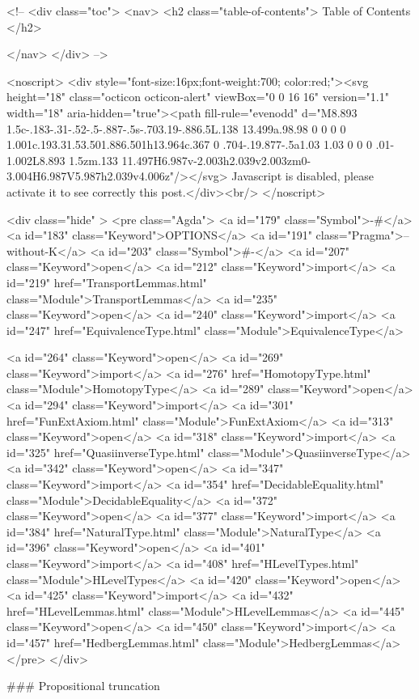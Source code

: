   <!-- 
  <div class="toc">
    <nav>
    <h2 class="table-of-contents"> Table of Contents </h2>
      

    </nav>
  </div>
   -->

  <noscript>
  <div style="font-size:16px;font-weight:700; color:red;"><svg height="18" class="octicon octicon-alert" viewBox="0 0 16 16" version="1.1" width="18" aria-hidden="true"><path fill-rule="evenodd" d="M8.893 1.5c-.183-.31-.52-.5-.887-.5s-.703.19-.886.5L.138 13.499a.98.98 0 0 0 0 1.001c.193.31.53.501.886.501h13.964c.367 0 .704-.19.877-.5a1.03 1.03 0 0 0 .01-1.002L8.893 1.5zm.133 11.497H6.987v-2.003h2.039v2.003zm0-3.004H6.987V5.987h2.039v4.006z"/></svg> Javascript is disabled, please activate it to see correctly this post.</div><br/>
  </noscript>

  <div class="hide" >
<pre class="Agda">
<a id="179" class="Symbol">{-#</a> <a id="183" class="Keyword">OPTIONS</a> <a id="191" class="Pragma">--without-K</a> <a id="203" class="Symbol">#-}</a>
<a id="207" class="Keyword">open</a> <a id="212" class="Keyword">import</a> <a id="219" href="TransportLemmas.html" class="Module">TransportLemmas</a>
<a id="235" class="Keyword">open</a> <a id="240" class="Keyword">import</a> <a id="247" href="EquivalenceType.html" class="Module">EquivalenceType</a>

<a id="264" class="Keyword">open</a> <a id="269" class="Keyword">import</a> <a id="276" href="HomotopyType.html" class="Module">HomotopyType</a>
<a id="289" class="Keyword">open</a> <a id="294" class="Keyword">import</a> <a id="301" href="FunExtAxiom.html" class="Module">FunExtAxiom</a>
<a id="313" class="Keyword">open</a> <a id="318" class="Keyword">import</a> <a id="325" href="QuasiinverseType.html" class="Module">QuasiinverseType</a>
<a id="342" class="Keyword">open</a> <a id="347" class="Keyword">import</a> <a id="354" href="DecidableEquality.html" class="Module">DecidableEquality</a>
<a id="372" class="Keyword">open</a> <a id="377" class="Keyword">import</a> <a id="384" href="NaturalType.html" class="Module">NaturalType</a>
<a id="396" class="Keyword">open</a> <a id="401" class="Keyword">import</a> <a id="408" href="HLevelTypes.html" class="Module">HLevelTypes</a>
<a id="420" class="Keyword">open</a> <a id="425" class="Keyword">import</a> <a id="432" href="HLevelLemmas.html" class="Module">HLevelLemmas</a>
<a id="445" class="Keyword">open</a> <a id="450" class="Keyword">import</a> <a id="457" href="HedbergLemmas.html" class="Module">HedbergLemmas</a>
</pre>
</div>

### Propositional truncation

